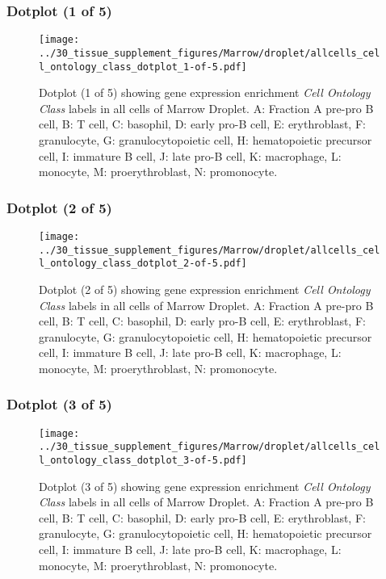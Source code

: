 \clearpage

\subsubsection{Dotplot (1 of 5)}
\begin{figure}[h]
\centering
\texttt{[image: ../30\_tissue\_supplement\_figures/Marrow/droplet/allcells\_cell\_ontology\_class\_dotplot\_1-of-5.pdf]}

\caption{ Dotplot (1 of 5)  showing gene expression enrichment \emph{Cell Ontology Class} labels in all cells of Marrow Droplet. A: Fraction A pre-pro B cell, B: T cell, C: basophil, D: early pro-B cell, E: erythroblast, F: granulocyte, G: granulocytopoietic cell, H: hematopoietic precursor cell, I: immature B cell, J: late pro-B cell, K: macrophage, L: monocyte, M: proerythroblast, N: promonocyte.}
\end{figure}


\clearpage

\subsubsection{Dotplot (2 of 5)}
\begin{figure}[h]
\centering
\texttt{[image: ../30\_tissue\_supplement\_figures/Marrow/droplet/allcells\_cell\_ontology\_class\_dotplot\_2-of-5.pdf]}

\caption{ Dotplot (2 of 5)  showing gene expression enrichment \emph{Cell Ontology Class} labels in all cells of Marrow Droplet. A: Fraction A pre-pro B cell, B: T cell, C: basophil, D: early pro-B cell, E: erythroblast, F: granulocyte, G: granulocytopoietic cell, H: hematopoietic precursor cell, I: immature B cell, J: late pro-B cell, K: macrophage, L: monocyte, M: proerythroblast, N: promonocyte.}
\end{figure}


\clearpage

\subsubsection{Dotplot (3 of 5)}
\begin{figure}[h]
\centering
\texttt{[image: ../30\_tissue\_supplement\_figures/Marrow/droplet/allcells\_cell\_ontology\_class\_dotplot\_3-of-5.pdf]}

\caption{ Dotplot (3 of 5)  showing gene expression enrichment \emph{Cell Ontology Class} labels in all cells of Marrow Droplet. A: Fraction A pre-pro B cell, B: T cell, C: basophil, D: early pro-B cell, E: erythroblast, F: granulocyte, G: granulocytopoietic cell, H: hematopoietic precursor cell, I: immature B cell, J: late pro-B cell, K: macrophage, L: monocyte, M: proerythroblast, N: promonocyte.}
\end{figure}


